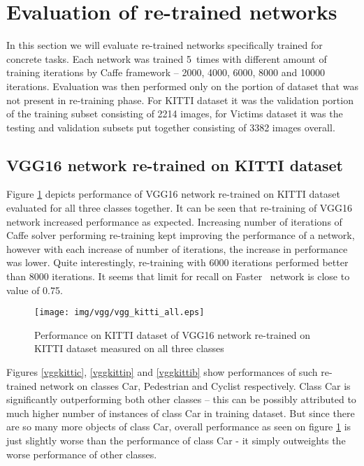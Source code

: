 \section{Evaluation of re-trained networks} \label{our}

In this section we will evaluate re-trained networks specifically trained for concrete tasks. Each network was trained 5~times with different amount of training iterations by Caffe framework -- 2000, 4000, 6000, 8000 and 10000 iterations. Evaluation was then performed only on the portion of dataset that was not present in re-training phase. For KITTI dataset it was the validation portion of the training subset consisting of 2214 images, for Victims dataset it was the testing and validation subsets put together consisting of 3382 images overall.

\subsection{VGG16 network re-trained on KITTI dataset}

Figure \ref{vggkittiall} depicts performance of VGG16 network re-trained on KITTI dataset evaluated for all three classes together. It can be seen that re-training of VGG16 network increased performance as expected. Increasing number of iterations of Caffe solver performing re-training kept improving the performance of a network, however with each increase of number of iterations, the increase in performance was lower. Quite interestingly, re-training with 6000 iterations performed better than 8000 iterations. It seems that limit for recall on Faster~\rcnn{} network is close to value of 0.75.

\begin{figure}[!]
\texttt{[image: img/vgg/vgg\_kitti\_all.eps]}
\caption[Performance of VGG16 network on KITTI dataset]{Performance on KITTI dataset of VGG16 network re-trained on KITTI dataset measured on all three classes}
\label{vggkittiall}
\end{figure}

Figures \ref{vggkittic}, \ref{vggkittip} and \ref{vggkittib} show performances of such re-trained network on classes Car, Pedestrian and Cyclist respectively. Class Car is significantly outperforming both other classes -- this can be possibly attributed to much higher number of instances of class Car in training dataset. But since there are so many more objects of class Car, overall performance as seen on figure \ref{vggkittiall} is just slightly worse than the performance of class Car - it simply outweights the worse performance of other classes.


